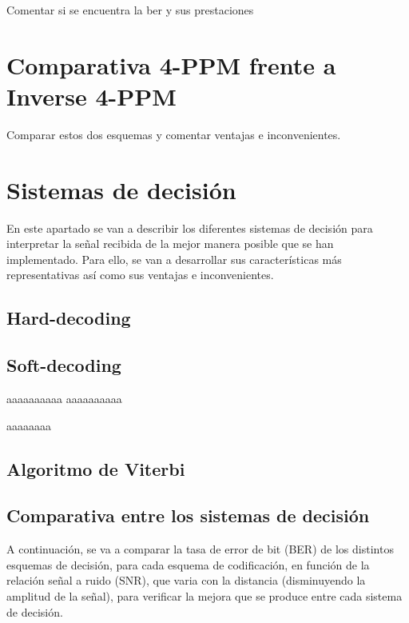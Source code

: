 Comentar si se encuentra la ber y sus prestaciones

\section{Comparativa 4-PPM frente a Inverse 4-PPM}
Comparar estos dos esquemas y comentar ventajas e inconvenientes.

\section{Sistemas de decisión}
En este apartado se van a describir los diferentes sistemas de decisión para interpretar la señal recibida de la mejor 
manera posible que se han implementado. Para ello, se van a desarrollar 
sus características más representativas así como sus ventajas e inconvenientes.

\subsection{Hard-decoding}


\subsection{Soft-decoding}
aaaaaaaaaa
aaaaaaaaaa

aaaaaaaa
\subsection{Algoritmo de Viterbi}


\subsection{Comparativa entre los sistemas de decisión}
A continuación, se va a comparar la tasa de error de bit (BER) de los distintos esquemas de decisión, para cada esquema 
de codificación, en función de la relación señal a ruido (SNR), que varia con la distancia (disminuyendo la 
amplitud de la señal), para verificar la mejora que se produce entre cada sistema de decisión.

